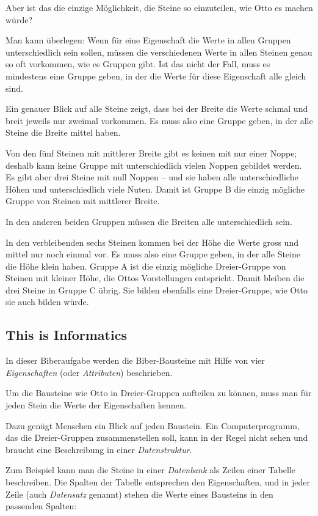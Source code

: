 \documentclass[a4paper,11pt]{report}
\begin{document}
Aber ist das die einzige Möglichkeit, die Steine so einzuteilen, wie Otto es machen würde?

Man kann überlegen:  Wenn für eine Eigenschaft die Werte in allen Gruppen unterschiedlich sein sollen, müssen die verschiedenen Werte in allen Steinen genau so oft vorkommen, wie es Gruppen gibt. Ist das nicht der Fall, muss es mindestens eine Gruppe geben, in der die Werte für diese Eigenschaft alle gleich sind.

Ein genauer Blick auf alle Steine zeigt, dass bei der Breite die Werte schmal und breit jeweils nur zweimal vorkommen. Es muss also eine Gruppe geben, in der alle Steine die Breite mittel haben.

Von den fünf Steinen mit mittlerer Breite gibt es keinen mit nur einer Noppe; deshalb kann keine Gruppe mit unterschiedlich vielen Noppen gebildet werden. Es gibt aber drei Steine mit null Noppen – und sie haben alle unterschiedliche Höhen und unterschiedlich viele Nuten. Damit ist Gruppe B die einzig mögliche Gruppe von Steinen mit mittlerer Breite.

In den anderen beiden Gruppen müssen die Breiten alle unterschiedlich sein.

In den verbleibenden sechs Steinen kommen bei der Höhe die Werte gross und mittel nur noch einmal vor. Es muss also eine Gruppe geben, in der alle Steine die Höhe klein haben. Gruppe A ist die einzig mögliche Dreier-Gruppe von Steinen mit kleiner Höhe, die Ottos Vorstellungen entspricht. Damit bleiben die drei Steine in Gruppe C übrig. Sie bilden ebenfalls eine Dreier-Gruppe, wie Otto sie auch bilden würde.


\subsection*{This is Informatics}

In dieser Biberaufgabe werden die Biber-Bausteine mit Hilfe von vier \emph{Eigenschaften} (oder \emph{Attributen}) beschrieben.

Um die Bausteine wie Otto in Dreier-Gruppen aufteilen zu können, muss man für jeden Stein die Werte der Eigenschaften kennen.

Dazu genügt Menschen ein Blick auf jeden Baustein. Ein Computerprogramm, das die Dreier-Gruppen zusammenstellen soll, kann in der Regel nicht sehen und braucht eine Beschreibung in einer \emph{Datenstruktur}.

Zum Beispiel kann man die Steine in einer \emph{Datenbank} als Zeilen einer Tabelle beschreiben. Die Spalten der Tabelle entsprechen den Eigenschaften, und in jeder Zeile (auch \emph{Datensatz} genannt) stehen die Werte eines Bausteins in den passenden Spalten:
\end{document}
